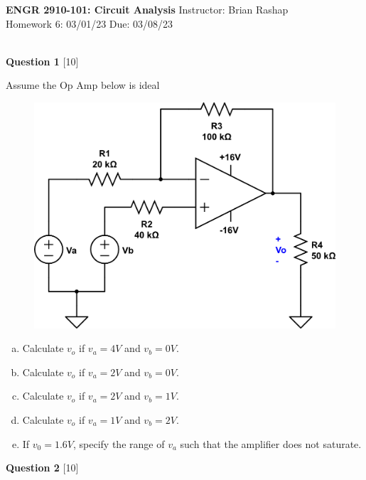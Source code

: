 \documentclass[12pt]{article}
\begin{document}
\begin{center}
\hfil
{\large\bf {ENGR 2910-101: Circuit Analysis}}
\hfill Instructor: Brian Rashap\\
Homework 6: 03/01/23 \hfill Due: 03/08/23\\
\hrulefill\\
\end{center}

{\bf Question 1} [10] %

Assume the Op Amp below is ideal

\begin{figure}[h!]
\begin{center}
 \includegraphics[scale=0.4]{p5_4.png}
\end{center}
\end{figure}

\begin{enumerate}[(a)]
\item Calculate $v_o$ if $v_a = 4V$ and $v_b = 0V$.
\item Calculate $v_o$ if $v_a = 2V$ and $v_b = 0V$.
\item Calculate $v_o$ if $v_a = 2V$ and $v_b = 1V$.
\item Calculate $v_o$ if $v_a = 1V$ and $v_b = 2V$.
\item If $v_0 = 1.6V$, specify the range of $v_a$ such that the amplifier does not saturate.
\end{enumerate}


\vspace{0.1in}

{\bf Question 2} [10] %
\end{document}
